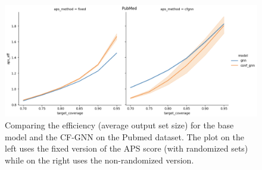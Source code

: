 \begin{figure}
    \centering
    \includegraphics[width=0.8\linewidth]{graphConformal/figures/PubMed_CF.png}
    \caption{Comparing the efficiency (average output set size) for the base model and the CF-GNN on the Pubmed dataset. The plot on the left uses the fixed version of the APS score (with randomized sets) while on the right uses the non-randomized version.}
    \label{fig:CFGNN:preliminary}
\end{figure}
